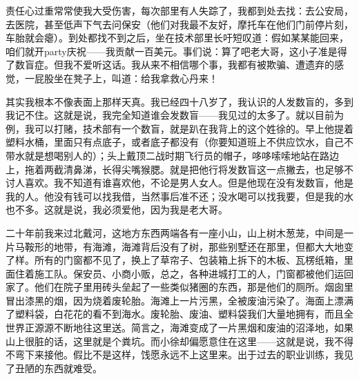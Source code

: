 责任心过重常常使我大受伤害，每次部里有人失踪了，我都到处去找：去公安局，去医院，甚至低声下气去问保安（他们对我最不友好，摩托车在他们门前停片刻，车胎就会瘪）。到处都找不到之后，坐在技术部里长吁短叹道：假如某某能回来，咱们就开party庆祝——我贡献一百美元。事们说：算了吧老大哥，这小子准是得了数盲症。但我不爱听这话。我从来不相信哪个事，我都有被欺骗、遭遗弃的感觉，一屁股坐在凳子上，叫道：给我拿救心丹来！ 

其实我根本不像表面上那样天真。我已经四十八岁了，我认识的人发数盲的，多到我记不住。这就是说，我完全知道谁会发数盲——我见过的太多了。就以目前为例，我可以打赌，技术部有一个数盲，就是趴在我背上的这个姓徐的。早上他提着塑料水桶，里面只有点底子，或者底子都没有（你要知道班上不供应饮水，自己不带水就是想喝别人的）；头上戴顶二战时期飞行员的帽子，哆哆嗦嗦地站在路边上，拖着两截清鼻涕，长得尖嘴猴腮。就是把他行将发数盲这一点撇去，也足够不讨人喜欢。我不知道有谁喜欢他，不论是男人女人。但是他现在没有发数盲，他是我的人。他没有钱可以找我借，当然事后准不还；没水喝可以找我要，但是我的水也不多。这就是说，我必须爱他，因为我是老大哥。 

二十年前我来过北戴河，这地方东西两端各有一座小山，山上树木葱茏，中间是一片马鞍形的地带，有海滩，海滩背后没有了树，那些别墅还在那里，但都大大地变了样。所有的门窗都不见了，换上了草帘子、包装箱上拆下的木板、瓦楞纸箱，里面住着施工队。保安员、小商小贩，总之，各种进城打工的人，门窗都被他们运回家了。他们在院子里用砖头垒起了一些类似猪圈的东西，那是他们的厕所。烟囱里冒出漆黑的烟，因为烧着废轮胎。海滩上一片污黑，全被废油污染了。海面上漂满了塑料袋，白花花的看不到海水。废轮胎、废油、塑料袋我们大量地拥有，而且全世界正源源不断地往这里送。简言之，海滩变成了一片黑烟和废油的沼泽地，如果山上很脏的话，这里就是个粪坑。而小徐却偏愿意住在这里——这就是说，我不得不弯下来接他。假比不是这样，饯愿永远不上这里来。出于过去的职业训练，我见了丑陋的东西就难受。 



